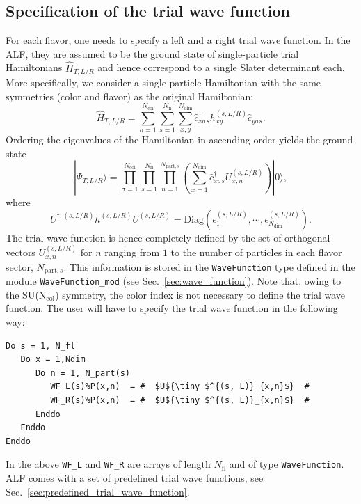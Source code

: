 \subsection{Specification of the trial wave function} \label{sec:trial_wave_function}

For each flavor, one needs to specify a left and a right trial wave function. In the ALF, they are assumed to be the ground state of single-particle trial Hamiltonians $\hat{H}_{T, L/R}$ and hence correspond to a single Slater determinant each. More specifically, we consider a single-particle Hamiltonian with the same symmetries (color and flavor) as the original Hamiltonian:
\begin{equation} \label{eq:trial_wave_function}
\hat{H}_{T,L/R} = 
\sum\limits_{\sigma=1}^{N_{\mathrm{col}}}
\sum\limits_{s=1}^{N_{\mathrm{fl}}}
\sum\limits_{x,y}^{N_{\mathrm{dim}}}
\hat{c}^{\dagger}_{x \sigma   s} h_{xy}^{(s, L/R)} \hat{c}^{\phantom\dagger}_{y \sigma s}.
\end{equation}
Ordering the eigenvalues  of the Hamiltonian in ascending order yields the ground state
\begin{equation}
	 | \Psi_{T,L/R} \rangle    =     \prod_{\sigma=1}^{N_{\mathrm{col}}}  \prod_{s=1}^{N_{\mathrm{fl}}}      \prod_{n=1}^{N_{\mathrm{part},s}} 
	 \left( \sum_{x=1}^{N_{\mathrm{dim}}}    \hat{c}^{\dagger}_{x \sigma   s} U^{(s, L/R)}_{x,n} \right) 
	  | 0 \rangle ,
\end{equation} 
where 
\begin{equation}
	U^{\dagger,(s, L/R)}h^{(s, L/R)}  U^{(s, L/R)}   = \mathrm{Diag} \left(   \epsilon_1^{(s, L/R)}, \cdots, \epsilon_{N_{\mathrm{dim}}}^{(s, L/R)} \right).
\end{equation}
The trial wave function is hence  completely defined by the set of orthogonal vectors  $ U^{(s, L/R)}_{x,n} $  for  $ n $ ranging from  $ 1 $ to  the number of particles   in each flavor sector, $N_{\mathrm{part},s}$.  This information  is stored in the \texttt{WaveFunction}  type defined in the module \texttt{WaveFunction\_mod} (see Sec.~\ref{sec:wave_function}).  Note that, owing to the SU(N$_{\mathrm{col}}$) symmetry, the color index is not necessary to define  the trial wave function.  The user will have to specify the trial wave function in the following way:
\begin{lstlisting}[style=fortran,escapechar=\#]
Do s = 1, N_fl
   Do x = 1,Ndim
      Do n = 1, N_part(s)
         WF_L(s)%P(x,n)  = #  $U${\tiny $^{(s, L)}_{x,n}$}  #
         WF_R(s)%P(x,n)  = #  $U${\tiny $^{(s, L)}_{x,n}$}  #
      Enddo
   Enddo
Enddo
\end{lstlisting}
In the above    \texttt{WF\_L}  and \texttt{WF\_R}  are arrays  of length $N_{\mathrm{fl}}$ and of type \texttt{WaveFunction}. ALF comes with a set of predefined trial wave functions, see Sec.~\ref{sec:predefined_trial_wave_function}.

